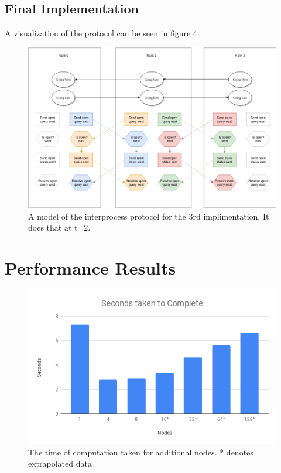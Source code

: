\documentclass[10pt,a4paper]{article}
\begin{document}
    
    \subsection{Final Implementation}
    A visualization of the protocol can be seen in figure 4.
    
    \begin{figure}
        \centering
        \includegraphics[scale=0.4]{imp3_diag.png}
        \caption{A model of the interprocess protocol for the 3rd implimentation. It does that at t=2.}
        \label{fig:my_label}
    \end{figure}
    
    \section{Performance Results}
    
    \begin{figure}[H]
        \centering
        \includegraphics[scale=0.3]{seconds.png}
        \caption{The time of computation taken for additional nodes. * denotes extrapolated data}
        \label{fig:my_label}
    \end{figure}
    
\end{document}
